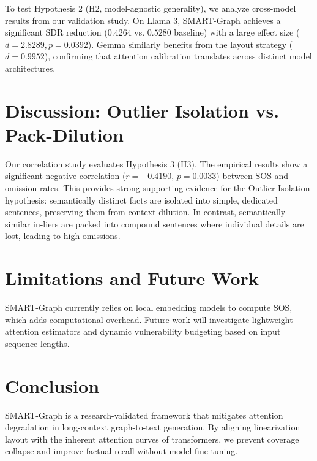 \documentclass[conference]{IEEEtran}
\begin{document}
To test Hypothesis 2 (H2, model-agnostic generality), we analyze cross-model results from our validation study. On Llama 3, SMART-Graph achieves a significant SDR reduction ($0.4264$ vs. $0.5280$ baseline) with a large effect size ($d = 2.8289, p = 0.0392$). Gemma similarly benefits from the layout strategy ($d = 0.9952$), confirming that attention calibration translates across distinct model architectures.

\section{Discussion: Outlier Isolation vs. Pack-Dilution}
Our correlation study evaluates Hypothesis 3 (H3). The empirical results show a significant negative correlation ($r = -0.4190$, $p = 0.0033$) between SOS and omission rates. This provides strong supporting evidence for the Outlier Isolation hypothesis: semantically distinct facts are isolated into simple, dedicated sentences, preserving them from context dilution. In contrast, semantically similar in-liers are packed into compound sentences where individual details are lost, leading to high omissions.

\section{Limitations and Future Work}
SMART-Graph currently relies on local embedding models to compute SOS, which adds computational overhead. Future work will investigate lightweight attention estimators and dynamic vulnerability budgeting based on input sequence lengths.

\section{Conclusion}
SMART-Graph is a research-validated framework that mitigates attention degradation in long-context graph-to-text generation. By aligning linearization layout with the inherent attention curves of transformers, we prevent coverage collapse and improve factual recall without model fine-tuning.



\end{document}
